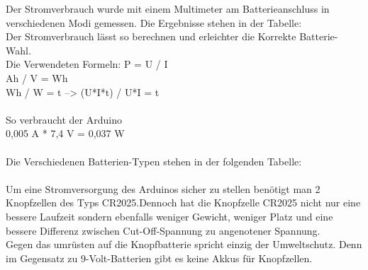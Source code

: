 Der Stromverbrauch wurde mit einem Multimeter am Batterieanschluss in
verschiedenen Modi gemessen. Die Ergebnisse stehen in der Tabelle:\\


Der Stromverbrauch lässt so berechnen und erleichter die Korrekte Batterie-Wahl.
\\
Die Verwendeten Formeln: 
P = U / I\\
Ah / V = Wh\\
Wh / W = t --> (U*I*t) / U*I = t\\
\\
So verbraucht der Arduino \\
0,005 A * 7,4 V = 0,037 W\\
\\
Die Verschiedenen Batterien-Typen stehen in der folgenden Tabelle:\\
\\
Um eine Stromversorgung des Arduinos sicher zu stellen benötigt man 2 Knopfzellen
des Typs CR2025.Dennoch hat die Knopfzelle CR2025 nicht nur eine bessere 
Laufzeit sondern ebenfalls weniger Gewicht, weniger Platz und eine bessere 
Differenz zwischen Cut-Off-Spannung zu angenotener Spannung.
\\
Gegen das umrüsten auf die Knopfbatterie spricht einzig der Umweltschutz. 
Denn im Gegensatz zu 9-Volt-Batterien gibt es keine Akkus für Knopfzellen.